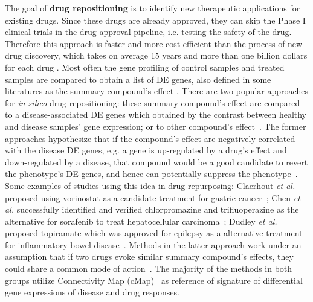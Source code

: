 The goal of \textbf{drug repositioning} is to identify new therapeutic applications for existing drugs. Since these drugs are already approved, they can skip the Phase I clinical trials in the drug approval pipeline, i.e. testing the safety of the drug. Therefore this approach is faster and more cost-efficient than the process of new drug discovery, which takes on average 15 years and more than one billion dollars for each drug \cite{chong2007new}. Most often the gene profiling of control samples and treated samples are compared to obtain a list of DE genes, also defined in some literatures as the summary compound's effect \cite{shaw2003transcriptional}. 
There are two popular approaches for \textit{in silico} drug repositioning: these summary compound's effect are compared to a disease-associated DE genes which obtained by the contrast between healthy and disease samples' gene expression; or to other compound's effect~\cite{iorio2013transcriptional}. The former approaches hypothesize that if the compound's effect are negatively correlated with the disease DE genes, e.g. a gene is up-regulated by a drug's effect and down-regulated by a disease, that compound would be a good candidate to revert the phenotype's DE genes, and hence can potentially suppress the phenotype~\cite{sirota2011discovery, mcart2011identification}. Some examples of studies using this idea in drug repurposing: Claerhout \textit{et al.} proposed using vorinostat as a candidate treatment for gastric cancer~\cite{claerhout2011gene}; Chen \textit{et al.} successfully identified and verified chlorpromazine and trifluoperazine as the alternative for sorafenib to treat hepatocellular carcinoma~\cite{chen2011gene}; Dudley \textit{et al.} proposed topiramate which was approved for epilepsy as a alternative treatment for inflammatory bowel disease~\cite{dudley2011computational}. Methods in the latter approach work under an assumption that if two drugs evoke similar summary compound's effects, they could share a common mode of action~\cite{iorio2010identification, iorio2010discovery, wolpaw2011modulatory, wolpaw2011modulatory, hu2009human, chiang2009systematic}. The majority of the methods in both groups utilize Connectivity Map (cMap)~\cite{lamb2007connectivity, lamb2006connectivity} as reference of signature of differential gene expressions of disease and drug responses.

